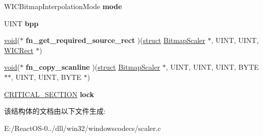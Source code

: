 \begin{DoxyCompactItemize}
W\+I\+C\+Bitmap\+Interpolation\+Mode {\bfseries mode}
\item 
\mbox{\label{struct_bitmap_scaler_a1a699c0fd3de4f323c88e3fea3b0224e}} 
U\+I\+NT {\bfseries bpp}
\item 
\mbox{\label{struct_bitmap_scaler_ae59e8a3064120b0a144ed754f25b3d1a}} 
\hyperlink{interfacevoid}{void}($\ast$ {\bfseries fn\+\_\+get\+\_\+required\+\_\+source\+\_\+rect} )(\hyperlink{interfacestruct}{struct} \hyperlink{struct_bitmap_scaler}{Bitmap\+Scaler} $\ast$, U\+I\+NT, U\+I\+NT, \hyperlink{struct_w_i_c_rect}{W\+I\+C\+Rect} $\ast$)
\item 
\mbox{\label{struct_bitmap_scaler_a2194635f54b8520c98ee1484199620be}} 
\hyperlink{interfacevoid}{void}($\ast$ {\bfseries fn\+\_\+copy\+\_\+scanline} )(\hyperlink{interfacestruct}{struct} \hyperlink{struct_bitmap_scaler}{Bitmap\+Scaler} $\ast$, U\+I\+NT, U\+I\+NT, U\+I\+NT, B\+Y\+TE $\ast$$\ast$, U\+I\+NT, U\+I\+NT, B\+Y\+TE $\ast$)
\item 
\mbox{\label{struct_bitmap_scaler_a2f449cb00bd073084057bf638f586192}} 
\hyperlink{struct___c_r_i_t_i_c_a_l___s_e_c_t_i_o_n}{C\+R\+I\+T\+I\+C\+A\+L\+\_\+\+S\+E\+C\+T\+I\+ON} {\bfseries lock}
\end{DoxyCompactItemize}


该结构体的文档由以下文件生成\+:\begin{DoxyCompactItemize}
\item 
E\+:/\+React\+O\+S-\/0../dll/win32/windowscodecs/scaler.\+c\end{DoxyCompactItemize}
